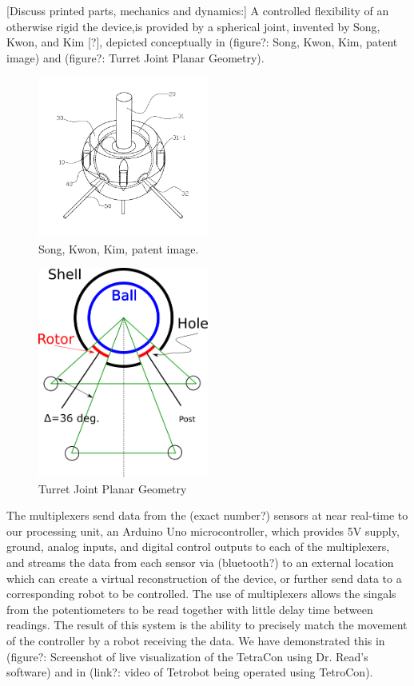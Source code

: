 \documentclass[11pt]{article}
\begin{document}
 [Discuss printed parts, mechanics and dynamics:]
 A controlled flexibility of an otherwise rigid the device,is provided by a spherical joint, invented by Song, Kwon, and Kim [?], depicted conceptually in (figure?: Song, Kwon, Kim, patent image) and (figure?: Turret Joint Planar Geometry).
 
\begin{figure}[H]
  \centering
    \includegraphics[width=0.5\textwidth]{figures/SongKwonKimImage.png}
    \caption[Song, Kwon, Kim, patent image.]{Song, Kwon, Kim, patent image.}
      \label{SongKwonKimImage}
\end{figure}


\begin{figure}[H]
  \centering
  \includegraphics[width=0.5\textwidth]{figures/SimplifiedConstraintDrawing.png}
    \caption[Turret Joint Planar Geometry]{Turret Joint Planar Geometry}
      \label{simplified-constraint-drawing}
\end{figure}
 
 The  multiplexers send data from the (exact number?) sensors at near real-time to our processing unit, an Arduino Uno microcontroller, which provides 5V supply, ground, analog inputs, and digital control outputs to each of the multiplexers, and streams the data from each sensor via (bluetooth?) to an external location which can create a virtual reconstruction of the device, or further send data to a corresponding robot to be controlled. The use of multiplexers allows the singals from the potentiometers to be read together with little delay time between readings. The result of this system is the ability to precisely match the movement of the controller by a robot receiving the data. We have demonstrated this in (figure?: Screenshot of live visualization of the TetraCon using Dr. Read's software) and in (link?: video of Tetrobot being operated using TetroCon).
     
\end{document}
